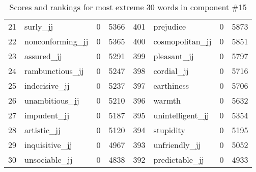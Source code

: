 \begin{table}[tbp]
\begin{tabular}{| rlr@{.}l | rlr@{.}l |}
    21 & surly\_jj & 0 & 5366    &    401 & prejudice & 0 & 5873 \\
    22 & nonconforming\_jj & 0 & 5365    &    400 & cosmopolitan\_jj & 0 & 5851 \\
    23 & assured\_jj & 0 & 5291    &    399 & pleasant\_jj & 0 & 5797 \\
    24 & rambunctious\_jj & 0 & 5247    &    398 & cordial\_jj & 0 & 5716 \\
    25 & indecisive\_jj & 0 & 5237    &    397 & earthiness & 0 & 5706 \\
    26 & unambitious\_jj & 0 & 5210    &    396 & warmth & 0 & 5632 \\
    27 & impudent\_jj & 0 & 5187    &    395 & unintelligent\_jj & 0 & 5354 \\
    28 & artistic\_jj & 0 & 5120    &    394 & stupidity & 0 & 5195 \\
    29 & inquisitive\_jj & 0 & 4967    &    393 & unfriendly\_jj & 0 & 5052 \\
    30 & unsociable\_jj & 0 & 4838    &    392 & predictable\_jj & 0 & 4933 \\
    \hline
    \end{tabular}
    \caption{Scores and rankings for most extreme 30 words in component \#15} 
\end{table}
\clearpage

